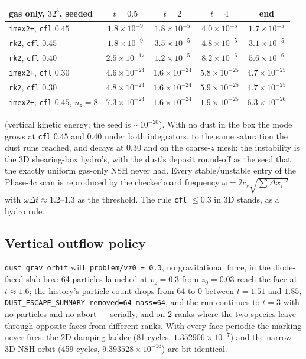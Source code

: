 \documentclass[11pt]{article}
\newcommand{\code}[1]{\texttt{#1}}
\begin{document}
\begin{center}
\small
\begin{tabular}{@{}lcccc@{}}
\toprule
gas only, $32^3$, seeded & $t = 0.5$ & $t = 2$ & $t = 4$ & end \\
\midrule
\code{imex2+}, \code{cfl} $0.45$ & $1.8\times10^{-9}$ & $1.8\times10^{-5}$ & $4.0\times10^{-5}$ & $1.7\times10^{-5}$ \\
\code{rk2}, \code{cfl} $0.45$ & $1.8\times10^{-9}$ & $3.5\times10^{-5}$ & $4.8\times10^{-5}$ & $3.1\times10^{-5}$ \\
\code{rk2}, \code{cfl} $0.40$ & $2.5\times10^{-17}$ & $1.2\times10^{-5}$ & $8.2\times10^{-6}$ & $5.6\times10^{-6}$ \\
\code{imex2+}, \code{cfl} $0.30$ & $4.6\times10^{-24}$ & $1.6\times10^{-24}$ & $5.8\times10^{-25}$ & $4.7\times10^{-25}$ \\
\code{rk2}, \code{cfl} $0.30$ & $4.8\times10^{-24}$ & $1.6\times10^{-24}$ & $5.9\times10^{-25}$ & $4.7\times10^{-25}$ \\
\code{imex2+}, \code{cfl} $0.45$, $n_z = 8$ & $7.3\times10^{-24}$ & $1.6\times10^{-24}$ & $1.9\times10^{-25}$ & $6.3\times10^{-26}$ \\
\bottomrule
\end{tabular}
\end{center}

(vertical kinetic energy; the seed is $\sim10^{-20}$). With no dust in the box the
mode grows at \code{cfl} $0.45$ and $0.40$ under both integrators, to the same
saturation the dust runs reached, and decays at $0.30$ and on the coarse-$z$ mesh: the
instability is the 3D shearing-box hydro's, with the dust's deposit round-off as the
seed that the exactly uniform gas-only NSH never had. Every stable/unstable entry of the
Phase-4c scan is reproduced by the checkerboard frequency
$\omega = 2c_s\sqrt{\sum\Delta x_i^{-2}}$ with $\omega\Delta t \approx 1.2$--$1.3$ as the
threshold. The rule \code{cfl} $\le 0.3$ in 3D stands, as a hydro rule.

\subsection{Vertical outflow policy}

\code{dust\_grav\_orbit} with \code{problem/vz0 = 0.3}, no gravitational force, in the
diode-faced slab box: 64 particles launched at $v_z = 0.3$ from $z_0 = 0.03$ reach the
face at $t \approx 1.6$; the history's particle count drops from 64 to 0 between
$t = 1.51$ and $1.85$, \code{DUST\_ESCAPE\_SUMMARY removed=64 mass=64}, and the run
continues to $t = 3$ with no particles and no abort --- serially, and on 2 ranks where
the two species leave through opposite faces from different ranks. With every face
periodic the marking never fires: the 2D damping ladder (81 cycles,
$1.352906\times10^{-7}$) and the narrow 3D NSH orbit (459 cycles,
$9.393528\times10^{-16}$) are bit-identical.
\end{document}
